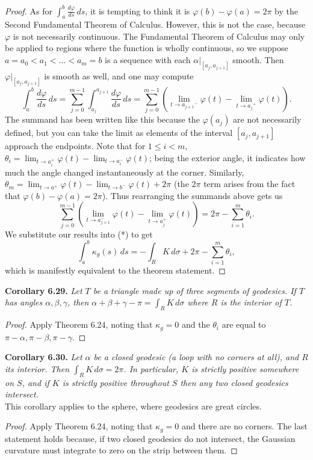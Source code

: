 \documentclass[leqno]{book}
\begin{document}
\begin{proof}
As for $\int_a^b\frac{d\varphi}{ds}\,ds$, it is tempting to think it is $\varphi(b)-\varphi(a)=2\pi$ by the Second Fundamental Theorem of Calculus.  However, this is not the case, because $\varphi$ is not necessarily continuous.  The Fundamental Theorem of Calculus may only be applied to regions where the function is wholly continuous, so we suppose $a=a_0<a_1<\dots<a_m=b$ is a sequence with each $\alpha|_{[a_j,a_{j+1}]}$ smooth.  Then $\varphi|_{[a_j,a_{j+1}]}$ is smooth as well, and one may compute
$$\int_a^b\frac{d\varphi}{ds}\,ds=\sum_{j=0}^{m-1}\int_{a_j}^{a_{j+1}}\frac{d\varphi}{ds}\,ds=\sum_{j=0}^{m-1}\left(\lim_{t\to{a_{j+1}}^-}\varphi(t)-\lim_{t\to{a_j}^+}\varphi(t)\right).$$
The summand has been written like this because the $\varphi(a_j)$ are not necessarily defined, but you can take the limit as elements of the interval $[a_j,a_{j+1}]$ approach the endpoints.  Note that for $1\leqslant i<m$, $\theta_i=\lim_{t\to a_i^+}\varphi(t)-\lim_{t\to a_i^-}\varphi(t)$; being the exterior angle, it indicates how much the angle changed instantaneously at the corner.  Similarly, $\theta_m=\lim_{t\to a^+}\varphi(t)-\lim_{t\to b^-}\varphi(t)+2\pi$ (the $2\pi$ term arises from the fact that $\varphi(b)-\varphi(a)=2\pi$).  Thus rearranging the summands above gets us
$$\sum_{j=0}^{m-1}\left(\lim_{t\to a_{j+1}^-}\varphi(t)-\lim_{t\to a_j^+}\varphi(t)\right)=2\pi-\sum_{i=1}^m\theta_i.$$
We substitute our results into (*) to get
$$\int_a^b\kappa_g(s)\,ds=-\int_RK\,d\sigma+2\pi-\sum_{i=1}^m\theta_i,$$
which is manifestly equivalent to the theorem statement.
\end{proof}

\noindent\textbf{Corollary 6.29.} \emph{Let $T$ be a triangle made up of three segments of geodesics.  If $T$ has angles $\alpha,\beta,\gamma$, then $\alpha+\beta+\gamma-\pi=\int_RK\,d\sigma$ where $R$ is the interior of $T$.}
\begin{proof}
Apply Theorem 6.24, noting that $\kappa_g=0$ and the $\theta_i$ are equal to $\pi-\alpha,\pi-\beta,\pi-\gamma$.
\end{proof}

\noindent\textbf{Corollary 6.30.} \emph{Let $\alpha$ be a closed geodesic (a loop with no corners at all), and $R$ its interior.  Then $\int_R K\,d\sigma=2\pi$.  In particular, $K$ is strictly positive somewhere on $S$, and if $K$ is strictly positive throughout $S$ then any two closed geodesics intersect.}\\

\noindent This corollary applies to the sphere, where geodesics are great circles.
\begin{proof}
Apply Theorem 6.24, noting that $\kappa_g=0$ and there are no corners.  The last statement holds because, if two closed geodesics do not intersect, the Gaussian curvature must integrate to zero on the strip between them.
\end{proof}
\end{document}
